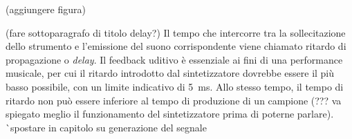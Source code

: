 (aggiungere figura)

(fare sottoparagrafo di titolo delay?)
Il tempo che intercorre tra la sollecitazione dello strumento e l'emissione del suono corrispondente viene chiamato ritardo di propagazione o \textit{delay}.
Il feedback uditivo è essenziale ai fini di una performance musicale, per cui il ritardo introdotto dal sintetizzatore
dovrebbe essere il più basso possibile, con un limite indicativo di \SI{5}{\milli\second}.
Allo stesso tempo, il tempo di ritardo non può essere inferiore al tempo di produzione di un campione (??? va spiegato meglio il funzionamento del sintetizzatore prima di poterne parlare).
^^ spostare in capitolo su generazione del segnale

